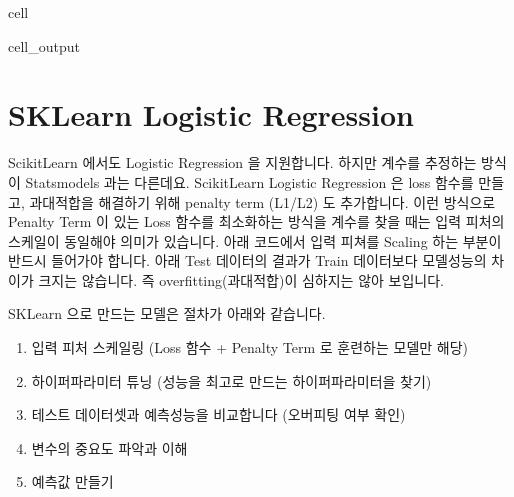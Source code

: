 \documentclass[letterpaper,10pt,english]{jupyterBook}
\begin{document}
\begin{sphinxuseclass}{cell}
\begin{sphinxVerbatimOutput}
\begin{sphinxuseclass}{cell_output}
\noindent{}

\end{sphinxuseclass}\end{sphinxVerbatimOutput}

\end{sphinxuseclass}

\section{SK\sphinxhyphen{}Learn \sphinxhyphen{} Logistic Regression}
\label{\detokenize{chapter5/5.2.2_Modeling_Library:sk-learn-logistic-regression}}
\sphinxAtStartPar
Scikit\sphinxhyphen{}Learn 에서도 Logistic Regression 을 지원합니다. 하지만 계수를 추정하는 방식이 Statsmodels 과는 다른데요. Scikit\sphinxhyphen{}Learn Logistic Regression 은 loss 함수를 만들고, 과대적합을 해결하기 위해 penalty term (L1/L2) 도 추가합니다. 이런 방식으로 Penalty Term 이 있는 Loss 함수를 최소화하는 방식을 계수를 찾을 때는 입력 피처의 스케일이 동일해야 의미가 있습니다. 아래 코드에서 입력 피쳐를 Scaling 하는 부분이 반드시 들어가야 합니다. 아래 Test 데이터의 결과가 Train 데이터보다 모델성능의 차이가 크지는 않습니다. 즉 overfitting(과대적합)이 심하지는 않아 보입니다.

\sphinxAtStartPar
SK\sphinxhyphen{}Learn 으로 만드는 모델은 절차가 아래와 같습니다.
\begin{enumerate}
%
\item {} 
\sphinxAtStartPar
입력 피처 스케일링 (Loss 함수 + Penalty Term 로 훈련하는 모델만 해당)

\item {} 
\sphinxAtStartPar
하이퍼파라미터 튜닝 (성능을 최고로 만드는 하이퍼파라미터을 찾기)

\item {} 
\sphinxAtStartPar
테스트 데이터셋과 예측성능을 비교합니다 (오버피팅 여부 확인)

\item {} 
\sphinxAtStartPar
변수의 중요도 파악과 이해

\item {} 
\sphinxAtStartPar
예측값 만들기

\end{enumerate}
\end{document}
